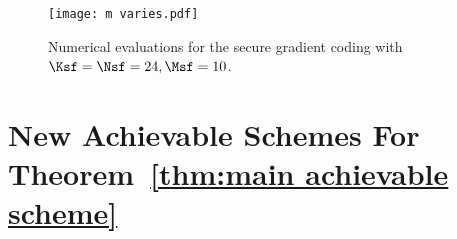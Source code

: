 \documentclass[conference,letterpaper]{IEEEtran}
\begin{document}
\begin{figure}[ht] 
    \centering
    \iffalse
    \begin{subfigure}[t]{0.5\textwidth}
        \centering
        \texttt{[image: M varies.pdf]}
        \caption{\small $(\Msf,\eta)$ tradeoff with $\Nsf=24$ and $\msf=2$.}
        \label{fig:numerical 1a}
    \end{subfigure}\\

    \begin{subfigure}[t]{0.5\textwidth}
        \centering
        \texttt{[image: N varies.pdf]}
        \caption{\small $(\Nsf,\eta)$ tradeoff with $\Ksf = \Nsf, \Msf=6, \msf=2$.}
        \label{fig:numerical 1b}
    \end{subfigure}\\
        \centering
    \fi
        \texttt{[image: m varies.pdf]}
    \caption{\small Numerical evaluations for the secure gradient coding with $\Ksf = \Nsf=24, \Msf=10$.}
    \label{fig:numerical 1}
\end{figure}



\section{New Achievable Schemes For Theorem~\ref{thm:main achievable scheme}}
\label{sec:Achievable coding scheme}
\iffalse
Before presenting our scheme, we note that the $\Ksf$ datasets can be divided into $\Nsf$ non-overlapping groups, with the $i^{\text{th}}$ group $\Gc_i = \{k \in [\Ksf]: \text{Mod}(k,\Nsf) = i\}$ containing $\frac{\Ksf}{\Nsf}$ datasets. Each group $\Gc_i$ is assigned to $\Msf = \Nsf - \Nsf_{\rm r} + \msf$ servers, who collaboratively compute the merged message $W^{\prime}_i$. Thus, we reformulate the $(\Ksf, \Nsf, \Nsf_{\rm r}, 1, \Msf)$ secure distributed linearly separable computation problem as an equivalent $(\Nsf, \Nsf, \Nsf_{\rm r}, 1, \Msf)$ problem.
\fi


\end{document}
